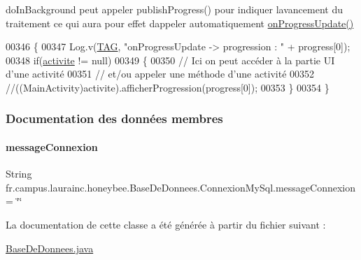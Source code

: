 do\+In\+Background peut appeler publish\+Progress() pour indiquer l\textquotesingle{}avancement du traitement ce qui aura pour effet d\textquotesingle{}appeler automatiquement \hyperlink{classfr_1_1campus_1_1laurainc_1_1honeybee_1_1_base_de_donnees_1_1_connexion_my_sql_ab9c34193cf45af727a5f5de4b27b1a46}{on\+Progress\+Update()} 
\begin{DoxyCode}
00346         \{
00347             Log.v(\hyperlink{classfr_1_1campus_1_1laurainc_1_1honeybee_1_1_base_de_donnees_ae800d867b3e423dd139e982736ab5587}{TAG}, \textcolor{stringliteral}{"onProgressUpdate -> progression : "} + progress[0]);
00348             \textcolor{keywordflow}{if}(\hyperlink{classfr_1_1campus_1_1laurainc_1_1honeybee_1_1_base_de_donnees_aad4fd29f29916bc4277fa16262d19431}{activite} != null)
00349             \{
00350                 \textcolor{comment}{// Ici on peut accéder à la partie UI d'une activité}
00351                 \textcolor{comment}{// et/ou appeler une méthode d'une activité}
00352                 \textcolor{comment}{//((MainActivity)activite).afficherProgression(progress[0]);}
00353             \}
00354         \}
\end{DoxyCode}


\subsubsection{Documentation des données membres}
\mbox{\label{classfr_1_1campus_1_1laurainc_1_1honeybee_1_1_base_de_donnees_1_1_connexion_my_sql_a8db83810efa310195fdd72bcbac2843f}} 
\paragraph{\texorpdfstring{message\+Connexion}{messageConnexion}}
{\footnotesize\ttfamily String fr.\+campus.\+laurainc.\+honeybee.\+Base\+De\+Donnees.\+Connexion\+My\+Sql.\+message\+Connexion = \char`\"{}\char`\"{}\hspace{0.3cm}{\ttfamily [private]}}



La documentation de cette classe a été générée à partir du fichier suivant \+:\begin{DoxyCompactItemize}
\item 
\hyperlink{_base_de_donnees_8java}{Base\+De\+Donnees.\+java}\end{DoxyCompactItemize}
